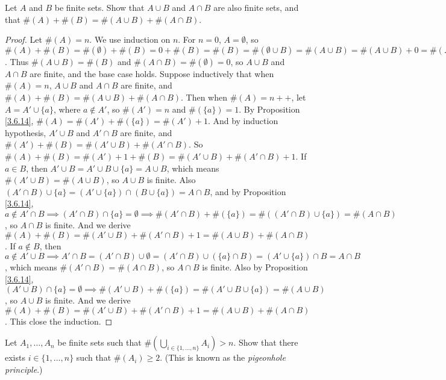 \begin{exercise}\label{ex 3.6.9}
Let \(A\) and \(B\) be finite sets.
Show that \(A \cup B\) and \(A \cap B\) are also finite sets, and that \(\#(A) + \#(B) = \#(A \cup B) + \#(A \cap B)\).
\end{exercise}

\begin{proof}
Let \(\#(A) = n\).
We use induction on \(n\).
For \(n = 0\), \(A = \emptyset\), so \(\#(A) + \#(B) = \#(\emptyset) + \#(B) = 0 + \#(B) = \#(B) = \#(\emptyset \cup B) = \#(A \cup B) = \#(A \cup B) + 0 = \#(A \cup B) + \#(\emptyset) = \#(A \cup B) + \#(\emptyset \cap B) = \#(A \cup B) + \#(A \cap B)\).
Thus \(\#(A \cup B) = \#(B)\) and \(\#(A \cap B) = \#(\emptyset) = 0\), so \(A \cup B\) and \(A \cap B\) are finite, and the base case holds.
Suppose inductively that when \(\#(A) = n\), \(A \cup B\) and \(A \cap B\) are finite, and \(\#(A) + \#(B) = \#(A \cup B) + \#(A \cap B)\).
Then when \(\#(A) = n++\), let \(A = A' \cup \{a\}\), where \(a \notin A'\), so \(\#(A') = n\) and \(\#(\{a\}) = 1\).
By Proposition \ref{3.6.14}, \(\#(A) = \#(A') + \#(\{a\}) = \#(A') + 1\).
And by induction hypothesis, \(A' \cup B\) and \(A' \cap B\) are finite, and \(\#(A') + \#(B) = \#(A' \cup B) + \#(A' \cap B)\).
So \(\#(A) + \#(B) = \#(A') + 1 + \#(B) = \#(A' \cup B) + \#(A' \cap B) + 1\).
If \(a \in B\), then \(A' \cup B = A' \cup B \cup \{a\} = A \cup B\), which means \(\#(A' \cup B) = \#(A \cup B)\), so \(A \cup B\) is finite.
Also \((A' \cap B) \cup \{a\} = (A' \cup \{a\}) \cap (B \cup \{a\}) = A \cap B\), and by Proposition \ref{3.6.14}, \(a \notin A' \cap B \implies (A' \cap B) \cap \{a\} = \emptyset \implies \#(A' \cap B) + \#(\{a\}) = \#((A' \cap B) \cup \{a\}) = \#(A \cap B)\), so \(A \cap B\) is finite.
And we derive \(\#(A) + \#(B) = \#(A' \cup B) + \#(A' \cap B) + 1 = \#(A \cup B) + \#(A \cap B)\).
If \(a \notin B\), then \(a \notin A' \cup B \implies A' \cap B = (A' \cap B) \cup \emptyset = (A' \cap B) \cup (\{a\} \cap B) = (A' \cup \{a\}) \cap B = A \cap B\), which means \(\#(A' \cap B) = \#(A \cap B)\), so \(A \cap B\) is finite.
Also by Proposition \ref{3.6.14}, \((A' \cup B) \cap \{a\} = \emptyset \implies \#(A' \cup B) + \#(\{a\}) = \#(A' \cup B \cup \{a\}) = \#(A \cup B)\), so \(A \cup B\) is finite.
And we derive \(\#(A) + \#(B) = \#(A' \cup B) + \#(A' \cap B) + 1 = \#(A \cup B) + \#(A \cap B)\).
This close the induction.
\end{proof}

\begin{exercise}\label{ex 3.6.10}
Let \(A_1, \dots, A_n\) be finite sets such that \(\#(\bigcup_{i \in \{1, \dots, n\}} A_i) > n\).
Show that there exists \(i \in \{1, \dots, n\}\) such that \(\#(A_i) \geq 2\).
(This is known as the \emph{pigeonhole principle}.)
\end{exercise}

